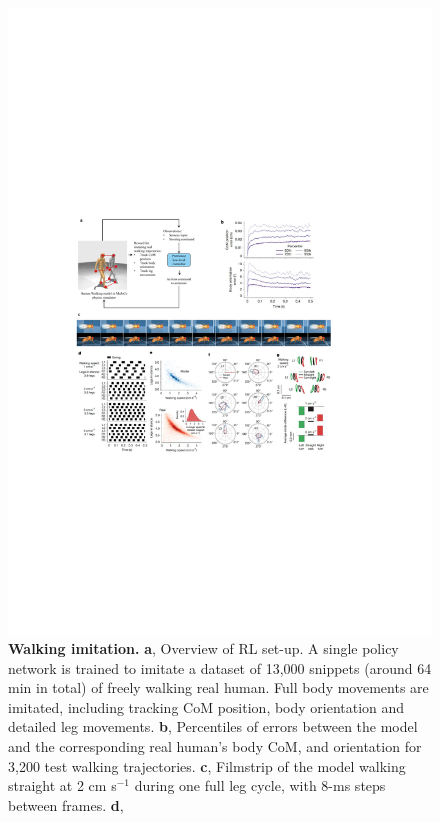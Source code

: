 \documentclass[sn-mathphys-num]{sn-jnl}%
\theoremstyle{thmstyleone}%
\theoremstyle{thmstyletwo}%
\theoremstyle{thmstylethree}%
\begin{document}
\begin{figure}[!htb]
	\centering
	\includegraphics[width=1.0\textwidth]{fig/fig_2.pdf}
	\caption{\textbf{Walking imitation.}
		\textbf{a}, Overview of RL set-up. 
		A single policy network is trained to imitate a dataset of 13,000 snippets (around 64 min in total) of freely walking real human. 
		Full body movements are imitated, including tracking CoM position, body orientation and detailed leg movements.
		\textbf{b}, %
		Percentiles of errors between the model and the corresponding real human's body CoM, and orientation for 3,200 test walking trajectories. 
		\textbf{c}, %
		Filmstrip of the model walking straight at 2 cm s$ ^{-1} $ during one full leg cycle, with 8-ms steps between frames. 
		\textbf{d}, %
}
\end{figure}
\end{document}
